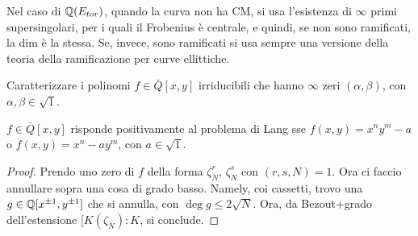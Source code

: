 \documentclass[a4paper,12pt]{article}
\begin{document}
\begin{remark}
	Nel caso di $\mathbb Q(E_{tor})$, quando la curva non ha CM, si usa l'esistenza di $\infty$ primi supersingolari, per i quali il Frobenius è centrale, e quindi, se non sono ramificati, la dim è la stessa. Se, invece, sono ramificati si usa sempre una versione della teoria della ramificazione per curve ellittiche.
\end{remark}

\begin{question}
	Caratterizzare i polinomi $f \in \bar{Q}[x,y]$ irriducibili che hanno $\infty$ zeri $(\alpha,\beta)$, con $\alpha, \beta \in \sqrt{1}$.
\end{question}

\begin{theorem}[Liadet?]
	$f \in \bar{Q}[x,y]$ risponde positivamente al problema di Lang sse $f(x,y)=x^ny^m-a$ o $f(x,y)=x^n-ay^m$, con $a \in \sqrt{1}$.
\end{theorem}
\begin{proof}
	Prendo uno zero di $f$ della forma $\zeta_N^r$, $\zeta_N^s$ con $(r,s,N)=1$. Ora ci faccio annullare sopra una cosa di grado basso. Namely, coi cassetti, trovo una $g \in \mathbb Q[x^{\pm 1},y^{\pm 1}]$ che si annulla, con $\deg g \leq 2\sqrt{N}$. Ora, da Bezout+grado dell'estensione $[K(\zeta_N):K$, si conclude.
\end{proof}
\end{document}
